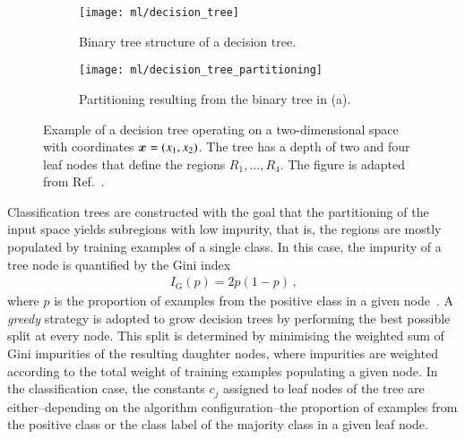 \begin{figure}[htbp]
  \centering

  \begin{subfigure}[b]{0.46\textwidth}
    \centering
    \texttt{[image: ml/decision\_tree]}
    \caption{Binary tree structure of a decision tree.}
  \end{subfigure}\hfill%
  \begin{subfigure}[b]{0.46\textwidth}
    \centering
    \texttt{[image: ml/decision\_tree\_partitioning]}
    \vspace*{0.7em}
    \caption{Partitioning resulting from the binary tree in (a).}
  \end{subfigure}\hfill%

  \caption{Example of a decision tree operating on a two-dimensional space with
    coordinates $\bm{x} = (x_1, x_2)$. The tree has a depth of two and four
    leaf nodes that define the regions $R_1, \dots, R_4$. The figure is adapted
    from Ref.~\cite{hastie09}.}%
  \label{fig:decision_tree}
\end{figure}

Classification trees are constructed with the goal that the partitioning of the
input space yields subregions with low impurity, that is, the regions are mostly
populated by training examples of a single class. In this case, the impurity of
a tree node is quantified by the Gini index
\begin{align*}
  I_{\text{G}}(p) = 2 p (1 - p) \,\text{,}
\end{align*}
where $p$ is the proportion of examples from the positive class in a given
node~\cite{hastie09}. A \emph{greedy} strategy is adopted to grow decision trees
by performing the best possible split at every node. This split is determined by
minimising the weighted sum of Gini impurities of the resulting daughter nodes,
where impurities are weighted according to the total weight of training examples
populating a given node. In the classification case, the constants $c_j$
assigned to leaf nodes of the tree are either--depending on the algorithm
configuration--the proportion of examples from the positive class or the class
label of the majority class in a given leaf node.

